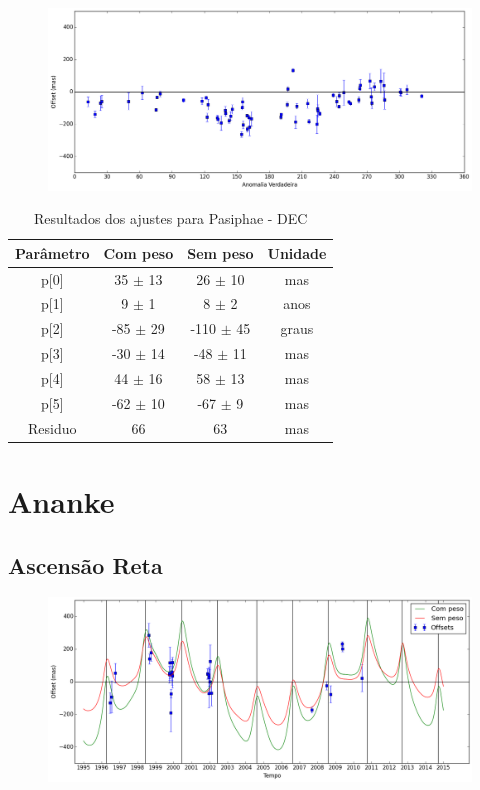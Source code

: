 \documentclass[11pt,a4paper]{report}
\begin{document}
\begin{figure}[h]
\includegraphics[scale=0.45]{Pasiphae/DEC_anom.png}  
\end{figure}

\begin{table}[h!]
\caption{\label{Tab: Pasiphae-DEC} Resultados dos ajustes para Pasiphae - DEC}
\begin{centering}
\begin{tabular}{cccc}
\hline
\hline
Parâmetro & Com peso & Sem peso & Unidade\tabularnewline
\hline
p[0] & 35 $\pm$ 13 & 26 $\pm$ 10 & mas\\
p[1] & 9 $\pm$ 1 & 8 $\pm$ 2 & anos\\
p[2] & -85 $\pm$ 29 & -110 $\pm$ 45 & graus\\
p[3] & -30 $\pm$ 14 & -48 $\pm$ 11 & mas\\
p[4] & 44 $\pm$ 16 & 58 $\pm$ 13 & mas\\
p[5] & -62 $\pm$ 10 & -67 $\pm$ 9 & mas\\
Residuo & 66 & 63 & mas\\
\hline 
\end{tabular} 
\par\end{centering}
\end{table}

\chapter*{Ananke}
\section*{Ascensão Reta}

\begin{figure}[h]
\includegraphics[scale=0.45]{Ananke/RA.png} 
\end{figure}
\end{document}
